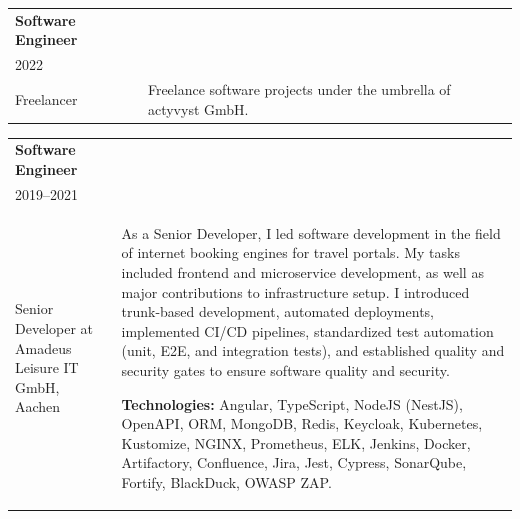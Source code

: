 \documentclass[a4paper,10pt]{article}
\begin{document}
\vspace{1em}
\noindent{\color{sectionblue}\rule{\textwidth}{0.4pt}}
\vspace{1em}

\begin{tabularx}{\textwidth}{>{\raggedright}p{4.5cm}X}
  \textbf{\color{sectionblue}Software Engineer} \\
  {\color{sectiongray}2022}                     \\
  \vspace{1.5em}
  Freelancer
   &
  Freelance software projects under the umbrella of actyvyst GmbH.
\end{tabularx}

\vspace{1em}
\noindent{\color{sectionblue}\rule{\textwidth}{0.4pt}}
\vspace{1em}

\begin{tabularx}{\textwidth}{>{\raggedright}p{4.5cm}X}
  \textbf{\color{sectionblue}Software Engineer} \\
  {\color{sectiongray}2019–2021}                \\
  \vspace{1.5em}
  Senior Developer at Amadeus Leisure IT GmbH, Aachen
   &
  As a Senior Developer, I led software development in the field of internet booking engines for travel portals.
  My tasks included frontend and microservice development, as well as major contributions to infrastructure setup.
  I introduced trunk-based development, automated deployments, implemented CI/CD pipelines, standardized test automation (unit, E2E, and integration tests), and established quality and security gates to ensure software quality and security.

  \textbf{Technologies:} Angular, TypeScript, NodeJS (NestJS), OpenAPI, ORM, MongoDB,
  Redis, Keycloak, Kubernetes, Kustomize, NGINX, Prometheus, ELK, Jenkins,
  Docker, Artifactory, Confluence, Jira, Jest, Cypress, SonarQube, Fortify,
  BlackDuck, OWASP ZAP.\@
\end{tabularx}

\vspace{1em}
\noindent{\color{sectionblue}\rule{\textwidth}{0.4pt}}
\vspace{1em}
\end{document}

